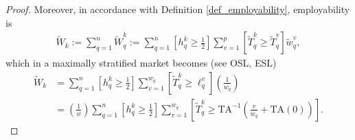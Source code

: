 \documentclass[hidelinks, nonatbib]{elsarticle}
\begin{document}
\begin{get_theorem}[GET]
\begin{proof}
        Moreover, in accordance with Definition \ref{def_employability}, employability is
        \begin{gather}
            \tilde{W}_{k}
            :=
            \sum_{q=1}^{n}
            \tilde{W}_{q}^{k}
            :=
            \sum_{q=1}^{n}
            \left[
                h_{q}^{k}
                \geq
                \frac{1}{2}
            \right]
            \sum_{v=1}^{p}
            \left[
                \tilde{T}_{q}^{k}
                \geq
                \tilde{T}_{q}^{v}
            \right]
            \tilde{w}_{q}^{v}
            ,
        \end{gather}
        which in a maximally stratified market becomes (see OSL, ESL)
        \begin{align}
            \tilde{W}_{k}
            &=
            \sum_{q=1}^{n}
            \left[
                h_{q}^{k}
                \geq
                \frac{1}{2}
            \right]
            \sum_{v=1}^{w_q}
            \left[
                \tilde{T}_{q}^{k}
                \geq
                \ell_{q}^{v}
            \right]
            \left(
                \frac{1}{w_q}
            \right)
            \\
            &=
            \left(
                \frac{1}{w}
            \right)
            \sum_{q=1}^{n}
            \left[
                h_{q}^{k}
                \geq
                \frac{1}{2}
            \right]
            \sum_{v=1}^{w_q}
            \left[
                \tilde{T}_{q}^{k}
                \geq
                \text{TA}^{-1}
                \left(
                    \frac{v}{w_q}
                    +
                    \text{TA}(0)
                \right)
            \right]
            .
        \end{align}
    \end{proof}
\end{get_theorem}
\end{document}
